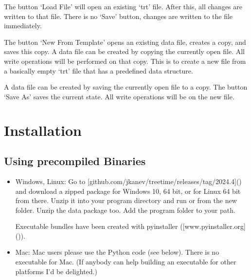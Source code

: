 \documentclass[letterpaper,10pt,english]{sphinxmanual}
\begin{document}
\sphinxAtStartPar
The button ‘Load File’ will open an existing ‘trt’ file. After this, all changes are written to that file. There is no ‘Save’ button, changes are written to the file immediately.

\sphinxAtStartPar
The button ‘New From Template’ opens an existing data file, creates a copy, and saves this copy. A data file can be created by copying the currently open file. All write operations will be performed on that copy. This is to create a new file from a basically empty ‘trt’ file that has a pre\sphinxhyphen{}defined data structure.

\sphinxAtStartPar
A data file can be created by saving the currently open file to a copy. The button ‘Save As’ saves the current state. All write operations will be on the new file.


\section{Installation}
\label{\detokenize{introduction:installation}}

\subsection{Using pre\sphinxhyphen{}compiled Binaries}
\label{\detokenize{introduction:using-pre-compiled-binaries}}\begin{itemize}
\item {} 
\sphinxAtStartPar
Windows, Linux: Go to {[}github.com/jkanev/treetime/releases/tag/2024.4{]}() and download a zipped package for Windows 10, 64 bit, or for Linux 64 bit from there. Unzip it into your program directory and run  or  from the new folder. Unzip the data package too. Add the program folder to your path.

\sphinxAtStartPar
Executable bundles have been created with pyinstaller ({[}www.pyinstaller.org{]}()).

\item {} 
\sphinxAtStartPar
Mac: Mac users please use the Python code (see below). There is no executable for Mac.
(If anybody can help building an executable for other platforms I’d be delighted.)

\end{itemize}
\end{document}
